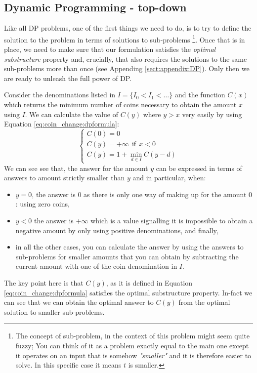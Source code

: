 \subsection{Dynamic Programming - top-down}
\label{sec:coin_change:topdown}
Like all DP problems, one of the first things we need to do, is to try to define the solution to the problem in terms of solutions to sub-problems
\footnote{The concept of sub-problem, in the context of this problem might seem quite fuzzy; You can think of it as a problem exactly equal to the main one except it operates on an input that
is  somehow \textit{"smaller"} and it is therefore easier to solve.
In this specific case it means $t$  is smaller.}.
Once that is in place, we need to make sure that our formulation satisfies the \textit{optimal substructure} property and, crucially, that also requires the solutions to the same sub-problems
more than once (see Appending \ref{sect:appendix:DP}). Only then we are ready to unleash the full power of DP.

Consider the denominations listed in $I=\{I_0 < I_1 < \ldots \}$ and the function $C(x)$ which returns the minimum number of coins necessary to obtain the amount $x$ using $I$. 
We can calculate the value of $C(y)$ where $y > x$ very easily by using Equation \ref{eq:coin_change:dpformula}:
\begin{equation}
	\begin{cases}
		C(0) = 0 \\
		C(y) = +\infty \: \: \text{if} \: \: x < 0 \\
 		C(y) = 1 + \min_{d \in I} C(y-d)
	 \end{cases}
	\label{eq:coin_change:dpformula}
\end{equation}
We can see see that, the answer for the amount $y$ can be expressed in terms of answers to amount strictly smaller than $y$ and in particular, when:
\begin{itemize}
	\item $y=0$, the answer is $0$ as there is only one way of making up for the amount $0$: using zero coins,
	\item $y<0$ the answer is $+\infty$ which is a value signalling it is impossible to obtain a negative amount by only using positive denominations, and finally,
	\item in all the other cases, you can calculate the answer by using the answers to sub-problems for smaller amounts that you can obtain by subtracting the current amount with one of the coin denomination in $I$.
\end{itemize} 
The key point here is that $C(y)$, as it is defined in Equation \ref{eq:coin_change:dpformula} satisfies the optimal substructure property.
In-fact we can see that we can obtain the optimal answer to $C(y)$ from the optimal solution to smaller sub-problems. 

